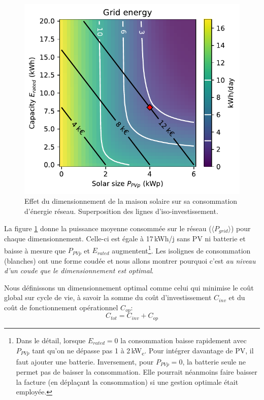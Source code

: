\documentclass[a4paper,10pt,twocolumn]{article}
\providecommand{\avg}[1]{\langle#1\rangle}
\newcommand\sub[1]{\textsubscript{#1}}
\newcommand\kWc{kW\sub{c}{}}
\begin{document}
\begin{figure}[!ht]
  \begin{center}
	  \includegraphics[width=0.8\columnwidth]{figures/Sizing_E_grid_invest_heatmap.pdf}
  \end{center}

  \caption{Effet du dimensionnement de la maison solaire sur sa consommation d'énergie réseau.
  Superposition des lignes d'iso-investissement.
  }
  \label{fig:P_grid_map}
\end{figure}

La figure \ref{fig:P_grid_map} donne la puissance moyenne consommée sur le réseau ($\avg{P_{grid}}$)
pour chaque dimensionnement. Celle-ci est égale à 17\,kWh/j sans PV ni batterie
et baisse à mesure que $P_{PVp}$ et $E_{rated}$ augmentent\footnote{
  Dans le détail,
  lorsque $E_{rated}=0$ la consommation baisse rapidement avec $P_{PVp}$
  tant qu'on ne dépasse pas 1 à 2\,\kWc. Pour intégrer davantage de PV,
  il faut ajouter une batterie.
  Inversement, pour $P_{PVp}=0$, la batterie seule ne permet pas de baisser la consommation.
  Elle pourrait néanmoins faire baisser la facture (en déplaçant la consommation)
  si une gestion optimale était employée.}.
Les isolignes de consommation (blanches) ont une forme coudée
et nous allons montrer pourquoi c'est \emph{au niveau d'un coude que le dimensionnement est optimal}.

Nous définissons un dimensionnement optimal comme celui qui minimise le coût global sur cycle de vie,
à savoir la somme du coût d'investissement $C_{inv}$
et du coût de fonctionnement opérationnel $C_{op}$:
%
\begin{equation} \label{eq:C_tot}
  C_{tot} = C_{inv} + C_{op}
\end{equation}
\end{document}
